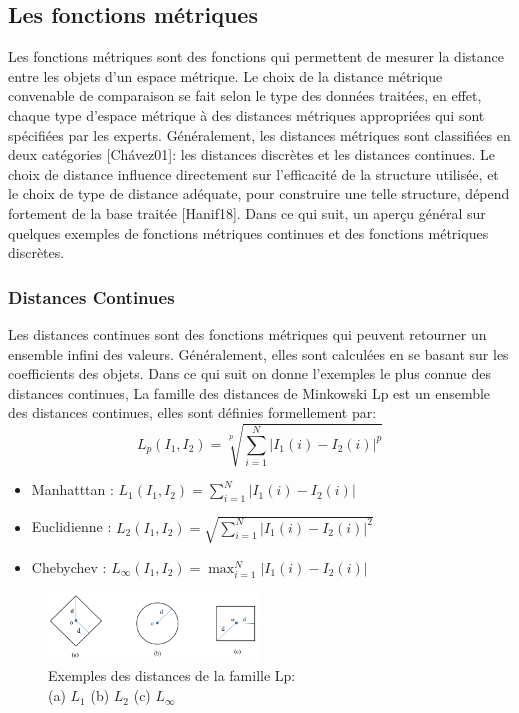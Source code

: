 \subsection{Les fonctions métriques}
Les fonctions métriques sont des fonctions qui permettent de mesurer la distance entre les objets d’un espace métrique. Le choix de la distance métrique convenable de comparaison se fait selon le type des données traitées, en effet, chaque type d’espace métrique à des distances métriques appropriées qui sont spécifiées par les experts. Généralement, les distances métriques sont classifiées en deux catégories [Chávez01]: les distances discrètes et les distances continues. Le choix de distance influence directement sur l’efficacité de la structure utilisée, et le choix de type de distance adéquate, pour construire une telle structure, dépend fortement de la base traitée [Hanif18]. Dans ce qui suit, un aperçu général sur quelques exemples de fonctions métriques continues et des fonctions métriques discrètes.

\subsubsection{Distances Continues}
Les distances continues sont des fonctions métriques qui peuvent retourner un ensemble infini des valeurs. Généralement, elles sont calculées en se basant sur les coefficients des objets. Dans ce qui suit  on donne l'exemples le plus connue des distances continues, La famille des distances de Minkowski Lp est un ensemble des distances continues, elles sont définies formellement par:
\begin{equation}
L_p(I_1, I_2) = \sqrt[p]{\sum_{i=1}^{N}  \left|{I}_{1}(i)-{I}_{2}(i)\right|^p} 
\end{equation}

\begin{itemize}
	\item Manhatttan :  $  L_1(I_1, I_2) = \sum_{i=1}^{N} \left|{I}_{1}(i)-{I}_{2}(i)\right|  $ 
	
	\item Euclidienne : $ L_2(I_1, I_2) =  \sqrt{\sum_{i=1}^{N} \left|{I}_{1}(i)-{I}_{2}(i)\right|^2} $
	
	\item Chebychev : 
	$L_{\infty}(I_1, I_2)=\max_{i=1}^N \left|{I}_{1}(i)-{I}_{2}(i)\right|$  
\end{itemize}

\begin{figure}[H]
	\centering
	\includegraphics[width=0.5\textwidth]{Figures/mink} %
	\caption{Exemples des distances de la famille Lp:\\ (a) $ L_1 $ (b) $ L_2 $ (c) 	$L_{\infty}$}
\end{figure}

